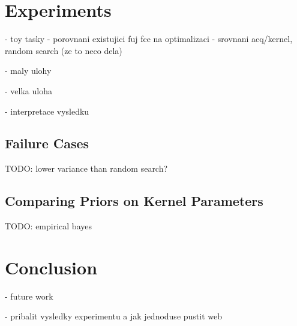 \chapter{Experiments}
\label{chapter:experiments}

- toy tasky
  - porovnani existujici fuj fce na optimalizaci
  - srovnani acq/kernel, random search (ze to neco dela)

- maly ulohy

- velka uloha

- interpretace vysledku
\\

\section{Failure Cases}


TODO: lower variance than random search?

\section{Comparing Priors on Kernel Parameters}
\label{section:experiments-empirical-bayes}

TODO: empirical bayes

\chapter{Conclusion}

- future work

- pribalit vysledky experimentu a jak jednoduse pustit web
